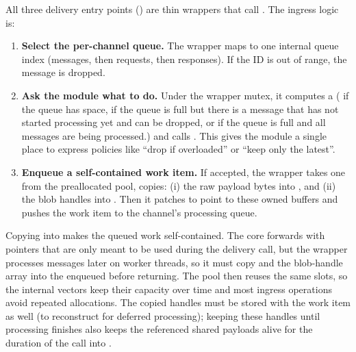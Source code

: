All three delivery entry points () are thin wrappers that call .
The ingress logic is:
\begin{enumerate}
    \item \textbf{Select the per-channel queue.}
    The wrapper maps  to one internal queue index (messages, then requests, then responses).
    If the ID is out of range, the message is dropped.
    \item \textbf{Ask the module what to do.}
    Under the wrapper mutex, it computes a  ( if the queue has space,  if the queue is full but there is a message that has not started processing yet and can be dropped, or  if the queue is full and all messages are being processed.) and calls .
    This gives the module a single place to express policies like “drop if overloaded” or “keep only the latest”.
    \item \textbf{Enqueue a self-contained work item.}
    If accepted, the wrapper takes one  from the preallocated pool, copies:
    (i) the raw payload bytes into ,
    and (ii) the blob handles into .
    Then it patches  to point to these owned buffers and pushes the work item to the channel's processing queue.
\end{enumerate}
Copying into  makes the queued work self-contained. The core forwards  with pointers that are only meant to be used during the delivery call, but the wrapper processes messages later on worker threads, so it must copy  and the blob-handle array into the enqueued  before returning. The pool then reuses the same  slots, so the internal vectors keep their capacity over time and most ingress operations avoid repeated allocations. The copied  handles must be stored with the work item as well (to reconstruct  for deferred processing); keeping these handles until processing finishes also keeps the referenced shared payloads alive for the duration of the call into .

